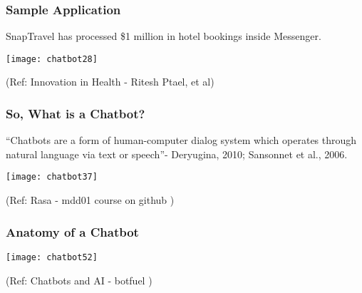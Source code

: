 \begin{frame}[fragile]\frametitle{Sample Application}

SnapTravel has processed \$1 million in hotel bookings inside Messenger.


\begin{center}
\texttt{[image: chatbot28]}
\end{center}

{\tiny (Ref: Innovation in Health - Ritesh Ptael, et al)}


\end{frame}



\begin{frame}[fragile]\frametitle{So, What is a Chatbot?}

``Chatbots are a form of human-computer dialog system which operates 
through natural language via text or speech''- Deryugina, 2010; Sansonnet et al., 2006.

\begin{center}
\texttt{[image: chatbot37]}

{\tiny (Ref: Rasa - mdd01 course on github )}

\end{center}

\end{frame}


\begin{frame}[fragile]\frametitle{Anatomy of a Chatbot}

\begin{center}
\texttt{[image: chatbot52]}

{\tiny (Ref: Chatbots and AI - botfuel )}

\end{center}

\end{frame}


